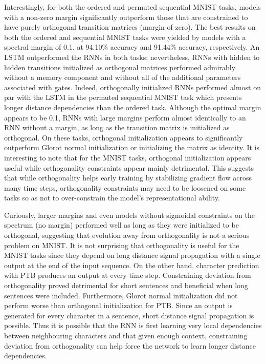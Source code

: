 \documentclass{article} %
\begin{document}
Interestingly, for both the ordered and permuted sequential MNIST tasks, models with a non-zero margin significantly outperform those that are constrained to have purely orthogonal transition matrices (margin of zero). The best results on both the ordered and sequential MNIST tasks were yielded by models with a spectral margin of 0.1, at 94.10\% accuracy and 91.44\% accuracy, respectively. An LSTM outperformed the RNNs in both tasks; nevertheless, RNNs with hidden to hidden transitions initialized as orthogonal matrices performed admirably without a memory component and without all of the additional parameters associated with gates. Indeed, orthogonally initialized RNNs performed almost on par with the LSTM in the permuted sequential MNIST task which presents longer distance dependencies than the ordered task. Although the optimal margin appears to be 0.1, RNNs with large margins perform almost identically to an RNN without a margin, as long as the transition matrix is initialized as orthogonal. On these tasks, orthogonal initialization appears to significantly outperform Glorot normal initialization \citep{glorot2010understanding} or initializing the matrix as identity. It is interesting to note that for the MNIST tasks, orthogonal initialization appears useful while orthogonality constraints appear mainly detrimental. This suggests that while orthogonality helps early training by stabilizing gradient flow across many time steps, orthogonality constraints may need to be loosened on some tasks so as not to over-constrain the model's representational ability.

Curiously, larger margins and even models without sigmoidal constraints on the spectrum (no margin) performed well as long as they were initialized to be orthogonal, suggesting that evolution away from orthogonality is not a serious problem on MNIST. It is not surprising that orthogonality is useful for the MNIST tasks since they depend on long distance signal propagation with a single output at the end of the input sequence. On the other hand, character prediction with PTB produces an output at every time step. Constraining deviation from orthogonality proved detrimental for short sentences and beneficial when long sentences were included. Furthermore, Glorot normal initialization did not perform worse than orthogonal initialization for PTB. Since an output is generated for every character in a sentence, short distance signal propagation is possible. Thus it is possible that the RNN is first learning very local dependencies between neighbouring characters and that given enough context, constraining deviation from orthogonality can help force the network to learn longer distance dependencies.
\end{document}
